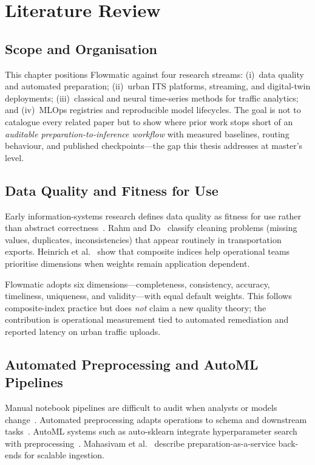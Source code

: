 %
%
\chapter{Literature Review}
\label{chap:literature}
\setlength{\parskip}{0.8em}

\section{Scope and Organisation}

This chapter positions Flowmatic against four research streams: (i)~data quality and automated preparation; (ii)~urban ITS platforms, streaming, and digital-twin deployments; (iii)~classical and neural time-series methods for traffic analytics; and (iv)~MLOps registries and reproducible model lifecycles. The goal is not to catalogue every related paper but to show where prior work stops short of an \emph{auditable preparation-to-inference workflow} with measured baselines, routing behaviour, and published checkpoints---the gap this thesis addresses at master's level.

\section{Data Quality and Fitness for Use}

Early information-systems research defines data quality as fitness for use rather than abstract correctness~\cite{wang1996beyond,pipino2002data}. Rahm and Do~\cite{rahm2000data} classify cleaning problems (missing values, duplicates, inconsistencies) that appear routinely in transportation exports. Heinrich et al.~\cite{heinrich2007assessing} show that composite indices help operational teams prioritise dimensions when weights remain application dependent.

Flowmatic adopts six dimensions---completeness, consistency, accuracy, timeliness, uniqueness, and validity---with equal default weights. This follows composite-index practice but does \emph{not} claim a new quality theory; the contribution is operational measurement tied to automated remediation and reported latency on urban traffic uploads.

\section{Automated Preprocessing and AutoML Pipelines}

Manual notebook pipelines are difficult to audit when analysts or models change~\cite{sculley2015hidden}. Automated preprocessing adapts operations to schema and downstream tasks~\cite{liu2022automated,sharma2022scenario}. AutoML systems such as auto-sklearn integrate hyperparameter search with preprocessing~\cite{feurer2015autosklearn,feurer2019auto,kumar2021automl}. Mahasivam et al.~\cite{mahasivam2017dataprep} describe preparation-as-a-service back-ends for scalable ingestion.

